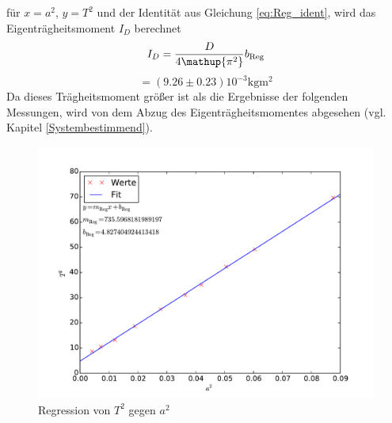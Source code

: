 für $x=a^2$, $y=T^2$ und der Identität aus Gleichung \eqref{eq:Reg_ident}, wird das Eigenträgheitsmoment $I_D$ berechnet
\begin{equation*}
	I_D= \frac{D}{4\mathup{\pi^2}}b_{\text{Reg}}\\
\end{equation*}
\begin{equation}
	\label{wert:eigentragheit}
	= (9.26\pm0.23)10^{-3} \si{\kilo\gram\meter\squared}
\end{equation}
Da dieses Trägheitsmoment größer ist als die Ergebnisse der folgenden Messungen, wird von dem Abzug des Eigenträgheitsmomentes abgesehen (vgl. Kapitel \ref{Systembestimmend}).
\begin{figure}[hp]
	\centering
	\label{fig:Regress}
	\includegraphics[width=\textwidth]{Bilder/Messung2.pdf}
	\caption{Regression von $T^2$ gegen $a^2$}
\end{figure}
\newpage
